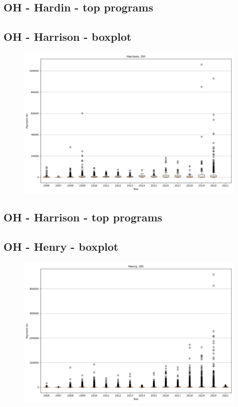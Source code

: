 \subsection*{OH - Hardin - top programs}

\newpage
\subsection*{OH - Harrison - boxplot}
\begin{figure}[h]
\centering
\includegraphics[width=7in]{../output/boxplots/counties/Harrison-OH_boxplot.png}
\end{figure}


\subsection*{OH - Harrison - top programs}

\newpage
\subsection*{OH - Henry - boxplot}
\begin{figure}[h]
\centering
\includegraphics[width=7in]{../output/boxplots/counties/Henry-OH_boxplot.png}
\end{figure}


